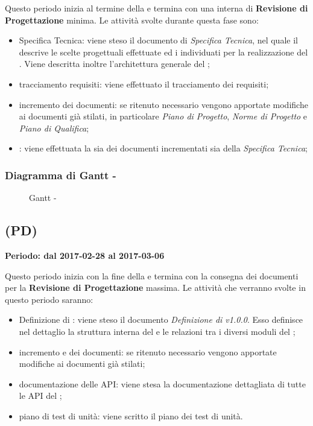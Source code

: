 \documentclass[./PianoDiProgetto.tex]{subfiles}
\begin{document}
\begin{itemize}
  Questo periodo inizia al termine della \PerAD{} e termina con una  interna di \textbf{Revisione di Progettazione} minima. Le attività svolte durante questa fase sono:
  \begin{itemize}
    \item Specifica Tecnica: viene steso il documento di \textit{Specifica Tecnica}, nel quale il \PJ{} descrive le scelte progettuali effettuate ed i  individuati per la realizzazione del . Viene descritta inoltre l'architettura generale del ;
    \item tracciamento requisiti: viene effettuato il tracciamento dei requisiti;
    \item incremento dei documenti: se ritenuto necessario vengono apportate modifiche ai documenti già stilati, in particolare \textit{Piano di Progetto}, \textit{Norme di Progetto} e \textit{Piano di Qualifica};
    \item {}: viene effettuata la  sia dei documenti incrementati sia della \textit{Specifica Tecnica};
  \end{itemize}

  \end{itemize}
  \subsubsection{Diagramma di Gantt - \PerPA}
    \begin{figure}[!h]
    \centering
    \caption{Gantt - \PerPA}
    \end{figure}

  \subsection{\PerPD{} (PD)}
  \textbf{Periodo: dal 2017-02-28 al 2017-03-06}

  Questo periodo inizia con la fine della \PerPA e termina con la consegna dei documenti per la \textbf{Revisione di Progettazione} massima. Le attività che verranno svolte in questo periodo saranno:
  \begin{itemize}
    \item Definizione di : viene steso il documento \textit{Definizione di  v1.0.0}. Esso definisce nel dettaglio la struttura interna del  e le relazioni tra i diversi moduli del ;
    \item incremento e  dei documenti: se ritenuto necessario vengono apportate modifiche ai documenti già stilati;
    \item documentazione delle API: viene stesa la documentazione dettagliata di tutte le API del ;
    \item piano di test di unità: viene scritto il piano dei test di unità.
  \end{itemize}
\end{document}
